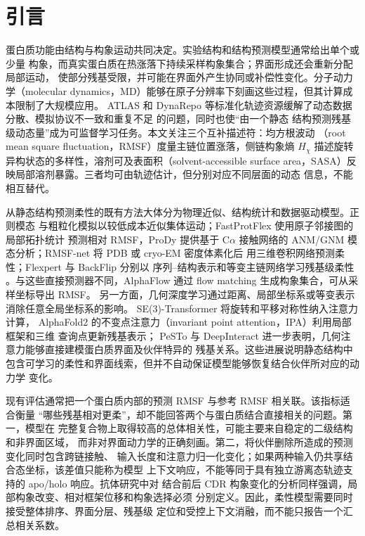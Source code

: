 
\section{引言}

蛋白质功能由结构与构象运动共同决定。实验结构和结构预测模型通常给出单个或少量
构象，而真实蛋白质在热涨落下持续采样构象集合；界面形成还会重新分配局部运动，
使部分残基受限，并可能在界面外产生协同或补偿性变化。分子动力学（molecular
dynamics，MD）能够在原子分辨率下刻画这些过程，但其计算成本限制了大规模应用。
ATLAS 和 DynaRepo 等标准化轨迹资源缓解了动态数据分散、模拟协议不一致和重复不足
的问题\cite{vandermeersche2024atlas,mokhtari2026dynarepo}，同时也使“由一个静态
结构预测残基级动态量”成为可监督学习任务。本文关注三个互补描述符：均方根波动
（root mean square fluctuation，RMSF）度量主链位置涨落，侧链构象熵
$H_\chi$ 描述旋转异构状态的多样性，溶剂可及表面积（solvent-accessible surface
area，SASA）反映局部溶剂暴露。三者均可由轨迹估计，但分别对应不同层面的动态
信息，不能相互替代。

从静态结构预测柔性的既有方法大体分为物理近似、结构统计和数据驱动模型。正则模态
与粗粒化模拟以较低成本近似集体运动；FastProtFlex 使用原子邻接图的局部拓扑统计
预测相对 RMSF\cite{praznikar2026fast}，ProDy 提供基于 C$\alpha$ 接触网络的
ANM/GNM 模态分析\cite{zhang2021prody}；RMSF-net 将 PDB 或 cryo-EM 密度体素化后
用三维卷积网络预测柔性\cite{song2024rmsfnet}；Flexpert 与 BackFlip 分别以
序列--结构表示和等变主链网络学习残基级柔性
\cite{kouba2025flexpert,viliuga2025backflip}。与这些直接预测器不同，AlphaFlow
通过 flow matching 生成构象集合，可从采样坐标导出 RMSF\cite{jing2024alphaflow}。
另一方面，几何深度学习通过距离、局部坐标系或等变表示消除任意全局坐标系的影响。
SE(3)-Transformer 将旋转和平移对称性纳入注意力计算\cite{fuchs2020se3}，
AlphaFold2 的不变点注意力（invariant point attention，IPA）利用局部框架和三维
查询点更新残基表示\cite{jumper2021alphafold}；
PeSTo 与 DeepInteract 进一步表明，几何注意力能够直接建模蛋白质界面及伙伴特异的
残基关系\cite{krapp2023pesto,morehead2022deepinteract}。这些进展说明静态结构中
包含可学习的柔性和界面线索，但并不自动保证模型能够恢复结合伙伴所对应的动力学
变化。

现有评估通常把一个蛋白质内部的预测 RMSF 与参考 RMSF 相关联。该指标适合衡量
“哪些残基相对更柔”，却不能回答两个与蛋白质结合直接相关的问题。第一，模型在
完整复合物上取得较高的总体相关性，可能主要来自稳定的二级结构和非界面区域，
而非对界面动力学的正确刻画。第二，将伙伴删除所造成的预测变化同时包含跨链接触、
输入长度和注意力归一化变化；如果两种输入仍共享结合态坐标，该差值只能称为模型
上下文响应，不能等同于具有独立游离态轨迹支持的 apo/holo 响应。抗体研究中对
结合前后 CDR 构象变化的分析同样强调，局部构象改变、相对框架位移和构象选择必须
分别定义\cite{liu2024cdr}。因此，柔性模型需要同时接受整体排序、界面分层、残基级
定位和受控上下文消融，而不能只报告一个汇总相关系数。

